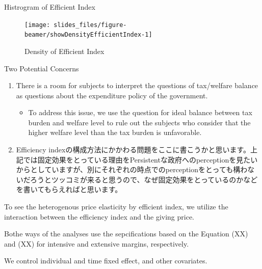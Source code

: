 \documentclass[
  ignorenonframetext,
]{beamer}
\providecommand{\tightlist}{%
  \setlength{\itemsep}{0pt}\setlength{\parskip}{0pt}}
\begin{document}
\begin{frame}{Histrogram of Efficient Index}
\protect\hypertarget{histrogram-of-efficient-index}{}
\begin{figure}[t]

{\centering \texttt{[image: slides\_files/figure-beamer/showDensityEfficientIndex-1]} 

}

\caption{Density of Efficient Index}\label{fig:showDensityEfficientIndex}
\end{figure}
\end{frame}

\begin{frame}{Two Potential Concerns}
\protect\hypertarget{two-potential-concerns}{}
\begin{enumerate}
\tightlist
\item
  There is a room for subjects to interpret the questions of tax/welfare balance as questions about the expenditure policy of the government.

  \begin{itemize}
  \tightlist
  \item
    To address this issue, we use the question for ideal balance between tax burden and welfare level to rule out the subjects who consider that the higher welfare level than the tax burden is unfavorable.
  \end{itemize}
\item
  Efficiency indexの構成方法にかかわる問題をここに書こうかと思います。上記では固定効果をとっている理由をPersistentな政府へのperceptionを見たいからとしていますが、別にそれぞれの時点でのperceptionをとっても構わないだろうとツッコミが来ると思うので、なぜ固定効果をとっているのかなどを書いてもらえればと思います。
\end{enumerate}

To see the heterogenous price elasticity by efficient index,
we utilize the interaction between the efficiency index and the giving price.

Bothe ways of the analyses use the sepcifications based on the Equation (XX) and (XX) for intensive and extensive margins,
respectively.

We control individual and time fixed effect,
and other covariates.
\end{frame}
\end{document}
